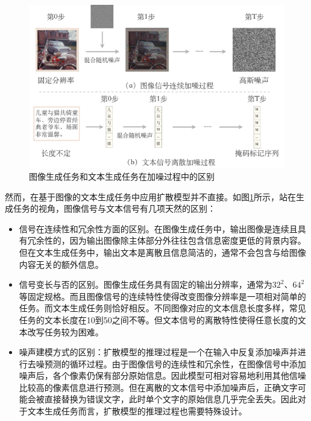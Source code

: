 \begin{figure}
  \centering
  \includegraphics[width=1.0\linewidth]{figures/ddcap-img-text-diff.pdf}
  \caption{图像生成任务和文本生成任务在加噪过程中的区别}
  \label{fig:ddcap-img-text-diff}
\end{figure}

然而，在基于图像的文本生成任务\cite{karpathy2015deep, vinyals2015show}中应用扩散模型并不直接。如图\ref{fig:ddcap-img-text-diff}所示，站在生成任务的视角，图像信号与文本信号有几项天然的区别：
\begin{itemize}
    \item 信号在连续性和冗余性方面的区别。在图像生成任务中，输出图像是连续且具有冗余性的，因为输出图像除主体部分外往往包含信息密度更低的背景内容。但在文本生成任务中，输出文本是离散且信息简洁的，通常不会包含与给图像内容无关的额外信息。
    \item 信号变长与否的区别。图像生成任务具有固定的输出分辨率，通常为$32^2$、$64^2$等固定规格。而且图像信号的连续特性使得改变图像分辨率是一项相对简单的任务\cite{dall-e2,super-resolution}。而文本生成任务则恰好相反。不同图像对应的文本信息长度多样，常见任务的文本长度在10到50之间不等。但文本信号的离散特性使得任意长度的文本改写任务较为困难。
    \item 噪声建模方式的区别：扩散模型的推理过程是一个在输入中反复添加噪声并进行去噪预测的循环过程。由于图像信号的连续性和冗余性，在图像信号中添加噪声后，各个像素仍保有部分原始信息。因此模型可相对容易地利用其他信噪比较高的像素信息进行预测。但在离散的文本信号中添加噪声后，正确文字可能会被直接替换为错误文字，此时单个文字的原始信息几乎完全丢失。因此对于文本生成任务而言，扩散模型的推理过程也需要特殊设计。
\end{itemize}

